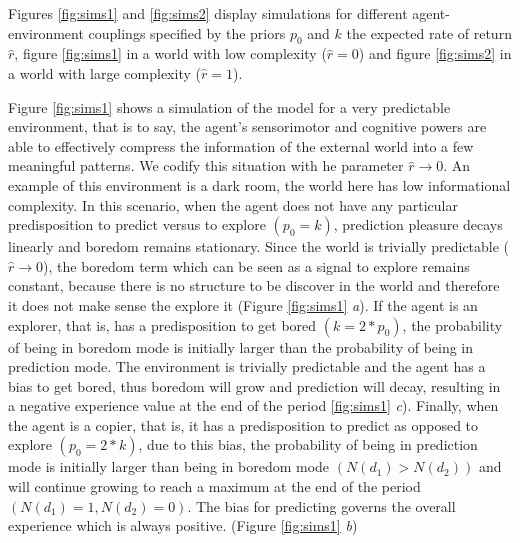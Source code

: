 \documentclass[11pt, onecolumn]{article}
\begin{document}

Figures \ref{fig:sims1} and \ref{fig:sims2} display simulations for different agent-environment couplings specified by the priors $p_0$ and $k$ the expected rate of return $\hat{r}$, figure \ref{fig:sims1} in a world with low complexity ($\hat{r} =0$) and  figure \ref{fig:sims2} in a world with large complexity ($\hat{r}=1$).

Figure \ref{fig:sims1} shows a simulation of the model for a very predictable environment, that is to say, the agent's sensorimotor and cognitive powers are able to effectively compress the information of the external world into a few meaningful patterns. We codify this situation with he parameter $\hat{r} \to 0$. An example of this environment is a dark room, the world here has low informational complexity.
In this scenario, when the agent does not have any particular predisposition to predict versus to explore $(p_0 = k)$, prediction pleasure decays linearly and boredom remains stationary. Since the world is trivially predictable ($\hat{r} \to 0$), the boredom term which can be seen as a signal to explore remains constant, because there is no structure to be discover in the world and therefore it does not make sense the explore it (Figure \ref{fig:sims1} \emph{a}). %
If the agent is an explorer, that is, has a predisposition to get bored $(k = 2*p_0)$, the probability of being in boredom mode is initially larger than the probability of being in prediction mode. The environment is trivially predictable and the agent has a bias to get bored, thus boredom will grow and prediction will decay, resulting in a negative experience value at the end of the period \ref{fig:sims1} \emph{c}). %
Finally, when the agent is a copier, that is, it has a predisposition to predict as opposed to explore $(p_0 = 2*k)$, due to this bias, the probability of being in prediction mode is initially larger than being in boredom mode $(N(d_1) > N(d_2))$ and will continue growing to reach a maximum at the end of the period  $(N(d_1) =1,  N(d_2) =0)$. The bias for predicting governs the overall experience which is always positive. (Figure \ref{fig:sims1} \emph{b}) %
\end{document}
